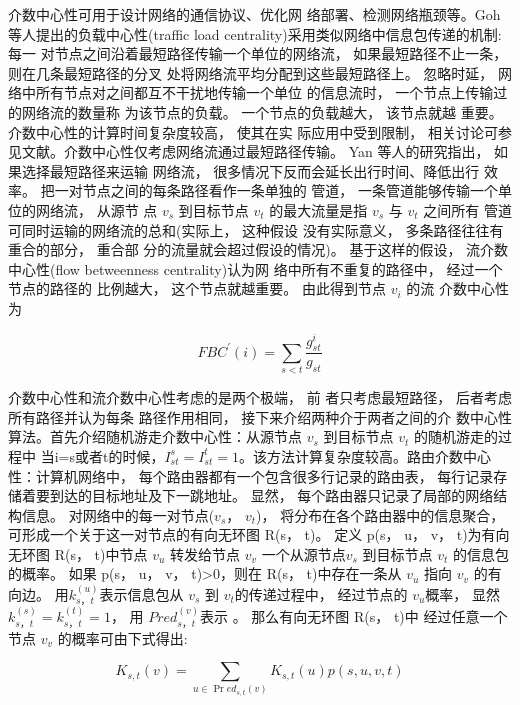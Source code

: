 				介数中心性可用于设计网络的通信协议、优化网 络部署、检测网络瓶颈等。Goh 等人提出的负载中心性(traffic load centrality)采用类似网络中信息包传递的机制\parencite{Goh2001Universal}: 每一 对节点之间沿着最短路径传输一个单位的网络流， 如果最短路径不止一条， 则在几条最短路径的分叉 处将网络流平均分配到这些最短路径上。 忽略时延， 网络中所有节点对之间都互不干扰地传输一个单位 的信息流时， 一个节点上传输过的网络流的数量称 为该节点的负载。 一个节点的负载越大， 该节点就越 重要。 介数中心性的计算时间复杂度较高， 使其在实 际应用中受到限制， 相关讨论可参见文献\parencite{Ulrik2001A,zt2006Notes}。介数中心性仅考虑网络流通过最短路径传输。 Yan 等人\parencite{Yan2006Efficient}的研究指出， 如果选择最短路径来运输 网络流， 很多情况下反而会延长出行时间、降低出行 效率。 把一对节点之间的每条路径看作一条单独的 管道， 一条管道能够传输一个单位的网络流， 从源节 点 $v_s$ 到目标节点 $v_t$ 的最大流量是指 $v_s$ 与 $v_t$ 之间所有 管道可同时运输的网络流的总和(实际上， 这种假设 没有实际意义， 多条路径往往有重合的部分， 重合部 分的流量就会超过假设的情况)。 基于这样的假设， 流介数中心性(flow betweenness centrality)\parencite{}认为网 络中所有不重复的路径中， 经过一个节点的路径的 比例越大， 这个节点就越重要。 由此得到节点 $v_i$ 的流 介数中心性为

			\[FBC^{'}(i) = \sum\limits_{s<t} {\frac{{g_{st}^i}}{{{g_{st}}}}} \]


				介数中心性和流介数中心性考虑的是两个极端， 前 者只考虑最短路径， 后者考虑所有路径并认为每条 路径作用相同， 接下来介绍两种介于两者之间的介 数中心性算法。首先介绍随机游走介数中心性：从源节点 $v_s$ 到目标节点 $v_t$ 的随机游走的过程中 当i=s或者t的时候，$I_{st}^s=I_{st}^t=1$。该方法计算复杂度较高。路由介数中心性：计算机网络中， 每个路由器都有一个包含很多行记录的路由表， 每行记录存储着要到达的目标地址及下一跳地址。 显然， 每个路由器只记录了局部的网络结构信息。 对网络中的每一对节点($v_s$， $v_t$)， 将分布在各个路由器中的信息聚合， 可形成一个关于这一对节点的有向无环图 R(s， t)。 定义 p(s， u， v， t)为有向无环图 R(s， t)中节点 $v_u$ 转发给节点 $v_v$ 一个从源节点$v_s$ 到目标节点 $v_t$ 的信息包的概率。 如果 p(s， u， v， t)>0，则在 R(s， t)中存在一条从 $v_u$ 指向 $v_v$ 的有向边。 用$k_{s，t}^{(u)}$表示信息包从 $v_s$ 到 $v_t$的传递过程中， 经过节点的 $v_u$概率， 显然$k_{s，t}^{(s)}=k_{s，t}^{(t)}=1$， 用 $Pred_{s，t}^{(v)}$表示 。 那么有向无环图 R(s， t)中 经过任意一个节点 $v_v$ 的概率可由下式得出:

\[{K_{s,t}}(v) = \sum\limits_{u \in \Pr e{d_{s,t}}(v)} {{K_{s,t}}(u)p(s,u,v,t)} \]

